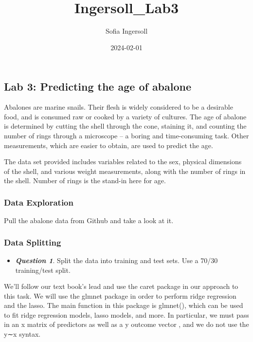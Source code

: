 \documentclass[
]{article}
\title{Ingersoll\_Lab3}
\author{Sofia Ingersoll}
\date{2024-02-01}
\providecommand{\tightlist}{%
  \setlength{\itemsep}{0pt}\setlength{\parskip}{0pt}}
\begin{document}
\maketitle

\hypertarget{lab-3-predicting-the-age-of-abalone}{%
\subsection{Lab 3: Predicting the age of
abalone}\label{lab-3-predicting-the-age-of-abalone}}

Abalones are marine snails. Their flesh is widely considered to be a
desirable food, and is consumed raw or cooked by a variety of cultures.
The age of abalone is determined by cutting the shell through the cone,
staining it, and counting the number of rings through a microscope -- a
boring and time-consuming task. Other measurements, which are easier to
obtain, are used to predict the age.

The data set provided includes variables related to the sex, physical
dimensions of the shell, and various weight measurements, along with the
number of rings in the shell. Number of rings is the stand-in here for
age.

\hypertarget{data-exploration}{%
\subsubsection{Data Exploration}\label{data-exploration}}

Pull the abalone data from Github and take a look at it.

\hypertarget{data-splitting}{%
\subsubsection{Data Splitting}\label{data-splitting}}

\begin{itemize}
\tightlist
\item
  \textbf{\emph{Question 1}}. Split the data into training and test
  sets. Use a 70/30 training/test split.
\end{itemize}

We'll follow our text book's lead and use the caret package in our
approach to this task. We will use the glmnet package in order to
perform ridge regression and the lasso. The main function in this
package is glmnet(), which can be used to fit ridge regression models,
lasso models, and more. In particular, we must pass in an x matrix of
predictors as well as a y outcome vector , and we do not use the y∼x
syntax.
\end{document}
